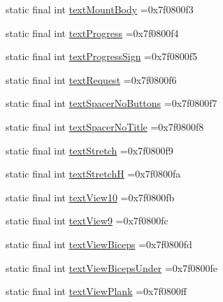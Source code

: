\begin{DoxyCompactItemize}
\item 
static final int \mbox{\hyperlink{classcom_1_1example_1_1trainawearapplication_1_1_r_1_1id_ae2b1b2c0c47583e4b2fe1380507485d3}{text\+Mount\+Body}} =0x7f0800f3
\item 
static final int \mbox{\hyperlink{classcom_1_1example_1_1trainawearapplication_1_1_r_1_1id_a976176eba3717e341c051da671d6a8d6}{text\+Progress}} =0x7f0800f4
\item 
static final int \mbox{\hyperlink{classcom_1_1example_1_1trainawearapplication_1_1_r_1_1id_a82250a87af600038c9d22255a31c468c}{text\+Progress\+Sign}} =0x7f0800f5
\item 
static final int \mbox{\hyperlink{classcom_1_1example_1_1trainawearapplication_1_1_r_1_1id_ad3ca292be8717ef68136ed97bb823ca6}{text\+Request}} =0x7f0800f6
\item 
static final int \mbox{\hyperlink{classcom_1_1example_1_1trainawearapplication_1_1_r_1_1id_a5a1499325e7e114be3bb71f25a2a6d48}{text\+Spacer\+No\+Buttons}} =0x7f0800f7
\item 
static final int \mbox{\hyperlink{classcom_1_1example_1_1trainawearapplication_1_1_r_1_1id_a91480878c14d9d4a25fa2bc980aeaebd}{text\+Spacer\+No\+Title}} =0x7f0800f8
\item 
static final int \mbox{\hyperlink{classcom_1_1example_1_1trainawearapplication_1_1_r_1_1id_ac57fa9d61c5956ebbcf1bc9d2921c8d1}{text\+Stretch}} =0x7f0800f9
\item 
static final int \mbox{\hyperlink{classcom_1_1example_1_1trainawearapplication_1_1_r_1_1id_aa14fd28b26f02222e5cfe02b3389a314}{text\+StretchH}} =0x7f0800fa
\item 
static final int \mbox{\hyperlink{classcom_1_1example_1_1trainawearapplication_1_1_r_1_1id_aedd05315fb20c41d4788deb90966885f}{text\+View10}} =0x7f0800fb
\item 
static final int \mbox{\hyperlink{classcom_1_1example_1_1trainawearapplication_1_1_r_1_1id_a38ed59eaff3cbe870585236a033a628c}{text\+View9}} =0x7f0800fc
\item 
static final int \mbox{\hyperlink{classcom_1_1example_1_1trainawearapplication_1_1_r_1_1id_acd152498f313b64111a8f071086e598c}{text\+View\+Biceps}} =0x7f0800fd
\item 
static final int \mbox{\hyperlink{classcom_1_1example_1_1trainawearapplication_1_1_r_1_1id_a9d96d112f17312e8a597c261c81d2ab2}{text\+View\+Biceps\+Under}} =0x7f0800fe
\item 
static final int \mbox{\hyperlink{classcom_1_1example_1_1trainawearapplication_1_1_r_1_1id_a14cb3a5339a016072be6c0f87cac1a8d}{text\+View\+Plank}} =0x7f0800ff

\end{DoxyCompactItemize}
